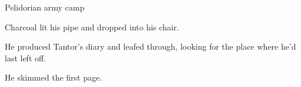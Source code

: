 \stamp
  {\dateCharcoalReadsMoreDiary}
  {Pelidorian army camp}

Charcoal lit his pipe and dropped into his chair. 

He produced Tantor's diary and leafed through, looking for the place where he'd last left off. 

He skimmed the first page. 



%
%
%
%
% 
%
% 
